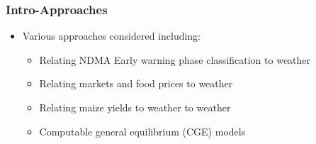 \documentclass{beamer}              %
\begin{document}
\begin{frame}\label{Intro-Approaches}
\frametitle{Intro-Approaches} 


\begin{itemize}
\item Various approaches considered including:

\begin{itemize}
\item Relating NDMA Early warning phase classification to weather
\item Relating markets and food prices to weather
\item Relating maize yields to weather to weather
\item Computable general equilibrium (CGE) models
\end{itemize}
\end{itemize}
\end{frame}

\end{document}
